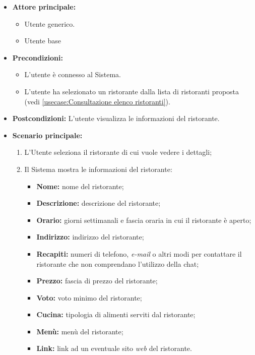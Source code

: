 \label{usecase:Visualizzazione di un ristorante}
\begin{itemize}
	\item \textbf{Attore principale:}    
	\begin{itemize}
        \item Utente generico.
        \item Utente base
    \end{itemize}

	\item \textbf{Precondizioni:}
	\begin{itemize}
        \item L'utente è connesso al Sistema.
        \item L'utente ha selezionato un ristorante dalla lista di ristoranti proposta (vedi \autoref{usecase:Consultazione elenco ristoranti}).
    \end{itemize}

	\item \textbf{Postcondizioni:} L'utente visualizza le informazioni del ristorante.

	\item \textbf{Scenario principale:}
		\begin{enumerate}
		    \item L'Utente seleziona il ristorante di cui vuole vedere i dettagli;
		    \item Il Sistema mostra le informazioni del ristorante:
		    \begin{itemize}
				\item \textbf{Nome:} nome del ristorante;
				\item \textbf{Descrizione:} descrizione del ristorante;
				\item \textbf{Orario:} giorni settimanali e fascia oraria in cui il ristorante è aperto;
				\item \textbf{Indirizzo:} indirizzo del ristorante;
				\item \textbf{Recapiti:} numeri di telefono, \textit{e-mail} o altri modi per contattare il ristorante che non comprendano l'utilizzo della chat;
				\item \textbf{Prezzo:} fascia di prezzo del ristorante;
				\item \textbf{Voto:} voto minimo del ristorante;
				\item \textbf{Cucina:} tipologia di alimenti serviti dal ristorante;
				\item \textbf{Menù:} menù del ristorante;
				\item \textbf{Link:} link ad un eventuale sito \textit{web} del ristorante. 
			\end{itemize}
	    \end{enumerate}

\end{itemize}
